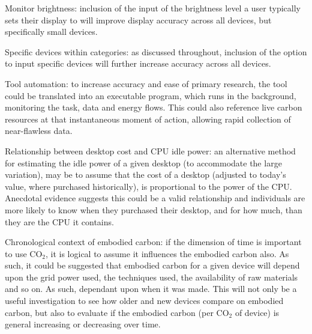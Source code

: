 \documentclass[conference]{IEEEtran}
\begin{document}
\begin{compactitem}
\item Monitor brightness: inclusion of the input of the brightness level a user typically sets
their display to will improve display accuracy across all devices, but
specifically small devices.

\item Specific devices within categories: as discussed throughout,
inclusion of the option to input specific devices will further
increase accuracy across all devices.

\item Tool automation: to increase accuracy and ease of primary
research, the tool could be translated into an executable program,
which runs in the background, monitoring the task, data and energy
flows. This could also reference live carbon resources at that
instantaneous moment of action, allowing rapid collection of
near-flawless data.

\item Relationship between desktop cost and CPU idle power: an
alternative method for estimating the idle power of a given desktop
(to accommodate the large variation), may be to assume that the cost
of a desktop (adjusted to today's value, where purchased
historically), is proportional to the power of the CPU. Anecdotal
evidence suggests this could be a valid relationship and individuals
are more likely to know when they purchased their desktop, and for how
much, than they are the CPU it contains.

\item Chronological context of embodied carbon: if the dimension
of time is important to use CO$_2$, it is logical to assume it influences
the embodied carbon also. As such, it could be suggested that embodied
carbon for a given device will depend upon the grid power used, the
techniques used, the availability of raw materials and so on. As such,
dependant upon when it was made. This will not only be a useful
investigation to see how older and new devices compare on embodied
carbon, but also to evaluate if the embodied carbon (per CO$_2$ of
device) is general increasing or decreasing over time.
\end{compactitem}







\end{document}
